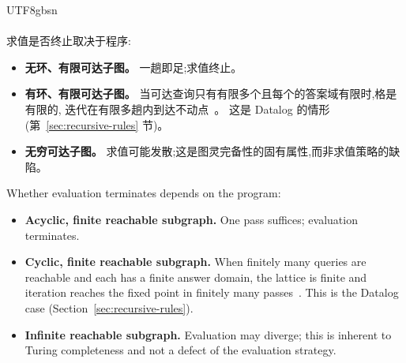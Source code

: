 \begin{CJK*}{UTF8}{gbsn}
\paragraph{}
\ifPaperChinese
求值是否终止取决于程序:
\begin{itemize}
  \item \textbf{无环、有限可达子图。}
    一趟即足;求值终止。
  \item \textbf{有环、有限可达子图。}
    当可达查询只有有限多个且每个的答案域有限时,格是有限的,
    迭代在有限多趟内到达不动点~\cite{bancilhon1986-recursive-query-strategies}。
    这是 Datalog 的情形(第~\ref{sec:recursive-rules} 节)。
  \item \textbf{无穷可达子图。}
    求值可能发散;这是图灵完备性的固有属性,而非求值策略的缺陷。
\end{itemize}
\else
Whether evaluation terminates depends on the
program:
\begin{itemize}
  \item \textbf{Acyclic, finite reachable subgraph.}
    One pass suffices; evaluation terminates.
  \item \textbf{Cyclic, finite reachable subgraph.}
    When finitely many queries are reachable and each has
    a finite answer domain, the lattice is finite and
    iteration reaches the fixed point in finitely many
    passes~\cite{bancilhon1986-recursive-query-strategies}.
    This is the Datalog case
    (Section~\ref{sec:recursive-rules}).
  \item \textbf{Infinite reachable subgraph.}
    Evaluation may diverge; this is inherent to
    Turing completeness and not a defect of the
    evaluation strategy.
\end{itemize}
\fi


\end{CJK*}
